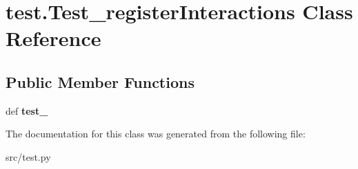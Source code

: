 \hypertarget{classtest_1_1_test__register_interactions}{\section{test.\-Test\-\_\-register\-Interactions \-Class \-Reference}
\label{classtest_1_1_test__register_interactions}
}
\subsection*{\-Public \-Member \-Functions}
\begin{DoxyCompactItemize}
\item 
\hypertarget{classtest_1_1_test__register_interactions_a323022aeef3c33601dfa21f181fa58e9}{def {\bfseries test\-\_\-}}\label{classtest_1_1_test__register_interactions_a323022aeef3c33601dfa21f181fa58e9}

\end{DoxyCompactItemize}


\-The documentation for this class was generated from the following file\-:\begin{DoxyCompactItemize}
\item 
src/test.\-py\end{DoxyCompactItemize}
